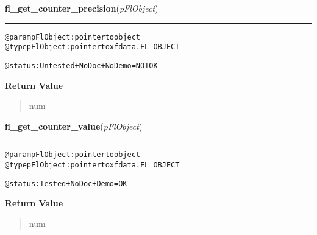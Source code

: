     \label{xformslib:flcounter:fl_get_counter_precision}

    \vspace{0.5ex}

\hspace{.8\funcindent}\begin{boxedminipage}{\funcwidth}

    \raggedright \textbf{fl\_get\_counter\_precision}(\textit{pFlObject})

    \vspace{-1.5ex}

    \rule{\textwidth}{0.5\fboxrule}
\setlength{\parskip}{2ex}
\begin{alltt}
@param pFlObject: pointer to object
@type pFlObject: pointer to xfdata.FL\_OBJECT

        @status: Untested + NoDoc + NoDemo = NOT OK
    
\end{alltt}

\setlength{\parskip}{1ex}
      \textbf{Return Value}
    \vspace{-1ex}

      \begin{quote}
      num

      \end{quote}

    \end{boxedminipage}

    \label{xformslib:flcounter:fl_get_counter_value}

    \vspace{0.5ex}

\hspace{.8\funcindent}\begin{boxedminipage}{\funcwidth}

    \raggedright \textbf{fl\_get\_counter\_value}(\textit{pFlObject})

    \vspace{-1.5ex}

    \rule{\textwidth}{0.5\fboxrule}
\setlength{\parskip}{2ex}
\begin{alltt}
@param pFlObject: pointer to object
@type pFlObject: pointer to xfdata.FL\_OBJECT

        @status: Tested + NoDoc + Demo = OK
    
\end{alltt}

\setlength{\parskip}{1ex}
      \textbf{Return Value}
    \vspace{-1ex}

      \begin{quote}
      num

      \end{quote}

    \end{boxedminipage}


